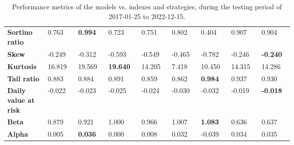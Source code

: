 \documentclass[../xlapes02]{subfiles}
\begin{document}
\begin{table}[h!]
{\begin{tabular}{*{9}{|m{0.075\linewidth}|}}
                          \bfseries Sortino ratio       & 0.763              & \color[HTML]{00F000} \bfseries 0.994 & 0.723                                 & 0.751            & 0.802 & 0.404 & 0.907 & 0.904 \\[0.5cm]
                          \bfseries Skew                & -0.249             & -0.312                               & -0.593                                & -0.549           & -0.465           & -0.782                               & -0.246                               & \color[HTML]{00F000} \bfseries -0.240 \\[0.5cm]
                          \bfseries Kurtosis            & 16.819             & 19.569                               & \color[HTML]{00F000} \bfseries 19.640 & 14.205           & 7.418 & 10.450 & 14.315 & 14.286 \\[0.5cm]
                          \bfseries Tail ratio          & 0.883              & 0.884                                & 0.891                                 & 0.859            & 0.862            & \color[HTML]{00F000} \bfseries 0.984 & 0.937 & 0.930 \\[0.5cm]
                          \bfseries Daily value at risk & -0.022             & -0.023                               & -0.025                                & -0.024           & -0.030           & -0.032                               & -0.019                               & \color[HTML]{00F000} \bfseries -0.018 \\[0.5cm]
                          \bfseries Beta                & 0.879              & 0.921                                & 1.000                                 & 0.966            & 1.007            & \color[HTML]{00F000} \bfseries 1.083 & 0.636 & 0.637 \\[0.5cm]
                          \bfseries Alpha               & 0.005              & \color[HTML]{00F000} \bfseries 0.036 & 0.000                                 & 0.008            & 0.032            & -0.039 & 0.034 & 0.035 \\[0.5cm]
                          \bottomrule
        \end{tabular}}
        \caption{Performance metrics of the models vs. indexes and strategies, during the testing period of 2017-01-25 to 2022-12-15.}
        \label{tab:stats}
    \end{table}
\end{document}
